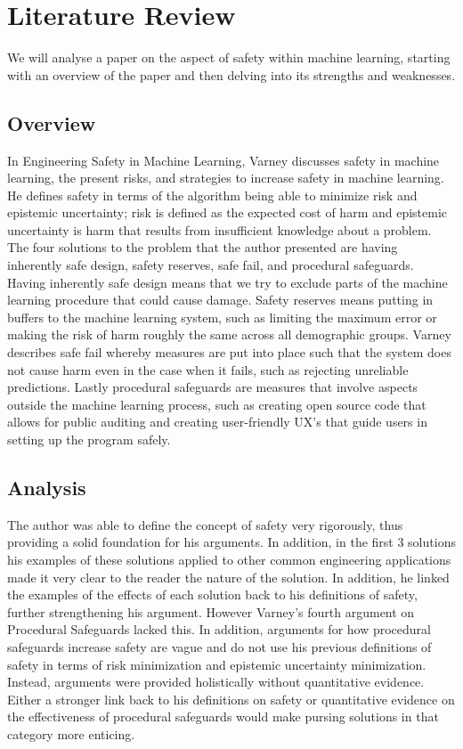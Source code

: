\documentclass[11pt,letterpaper,titlepage]{article}
\begin{document}
	\section{Literature Review}
	We will analyse a paper on the aspect of safety within machine learning, starting with an overview of the paper and then delving into its strengths and weaknesses.
	\subsection{Overview}
	In Engineering Safety in Machine Learning, Varney discusses safety in machine learning, the present risks, and strategies to increase safety in machine learning. He defines safety in terms of the algorithm being able to minimize risk and epistemic uncertainty; risk is defined as the expected cost of harm and epistemic uncertainty is harm that results from insufficient knowledge about a problem.
	The four solutions to the problem that the author presented are having inherently safe design, safety reserves, safe fail, and procedural safeguards. Having inherently safe design means that we try to exclude parts of the machine learning procedure that could cause damage. Safety reserves means putting in buffers to the machine learning system, such as limiting the maximum error or making the risk of harm roughly the same across all demographic groups. Varney describes safe fail whereby measures are put into place such that the system does not cause harm even in the case when it fails, such as rejecting unreliable predictions. Lastly procedural safeguards are measures that involve aspects outside the machine learning process, such as creating open source code that allows for public auditing and creating user-friendly UX's that guide users in setting up the program safely.
	\subsection{Analysis}
	The author was able to define the concept of safety very rigorously, thus providing a solid foundation for his arguments. In addition, in the first 3 solutions his examples of these solutions applied to other common engineering applications made it very clear to the reader the nature of the solution. In addition, he linked the examples of the effects of each solution back to his definitions of safety, further strengthening his argument. However Varney's fourth argument on Procedural Safeguards lacked this. In addition, arguments for how procedural safeguards increase safety are vague and do not use his previous definitions of safety in terms of risk minimization and epistemic uncertainty minimization. Instead, arguments were provided holistically without quantitative evidence. Either a stronger link back to his definitions on safety or quantitative evidence on the effectiveness of procedural safeguards would make pursing solutions in that category more enticing.
	
\end{document}
